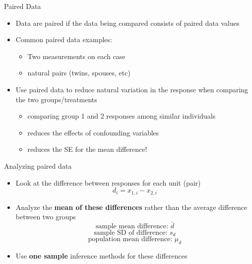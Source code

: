 \documentclass[
  10pt,
  ignorenonframetext,
]{beamer}
\providecommand{\tightlist}{%
  \setlength{\itemsep}{0pt}\setlength{\parskip}{0pt}}
\begin{document}
\begin{frame}{Paired Data}
\protect\hypertarget{paired-data}{}
\begin{itemize}
\item
  Data are paired if the data being compared consists of paired data
  values
\item
  Common paired data examples:

  \begin{itemize}
  \tightlist
  \item
    Two measurements on each case
  \item
    natural pairs (twins, spouses, etc)
  \end{itemize}
\item
  Use paired data to reduce natural variation in the response when
  comparing the two groups/treatments

  \begin{itemize}
  \tightlist
  \item
    comparing group 1 and 2 responses among similar individuals
  \item
    reduces the effects of confounding variables
  \item
    reduces the SE for the mean difference!
  \end{itemize}
\end{itemize}
\end{frame}

\begin{frame}{Analyzing paired data}
\protect\hypertarget{analyzing-paired-data}{}
\begin{itemize}
\item
  Look at the difference between responses for each unit (pair)
  \[d_{i} = x_{1,i} - x_{2,i}\]
\item
  Analyze the \textbf{mean of these differences} rather than the average
  difference between two groups
  \[\textrm{sample mean difference: } \bar{d}\]
  \[\textrm{sample SD of difference: } s_d\]
  \[\textrm{population mean difference: } \mu_d\]
\item
  Use \textbf{one sample} inference methods for these differences
\end{itemize}
\end{frame}
\end{document}
